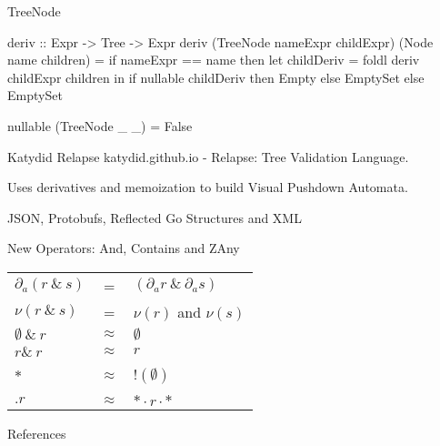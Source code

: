 \documentclass[10pt]{beamer}
\begin{document}
\begin{frame}[fragile]{TreeNode}
\begin{haskellcode}
deriv :: Expr -> Tree -> Expr
deriv (TreeNode nameExpr childExpr) 
      (Node name children) = 
  if nameExpr == name then
     let childDeriv = foldl deriv childExpr children
     in if nullable childDeriv
        then Empty
        else EmptySet
  else EmptySet
    
nullable (TreeNode _ _) = False
\end{haskellcode}
\end{frame}


\begin{frame}{Katydid Relapse}
katydid.github.io - Relapse: Tree Validation Language.

Uses derivatives and memoization to build Visual Pushdown Automata.

JSON, Protobufs, Reflected Go Structures and XML

New Operators: And, Contains and ZAny

\begin{center}
\begin{tabular}{l c l}
$\partial_a (r\ \&\ s) $ & = & $(\partial_a r\ \&\ \partial_a s)$ \\
$\nu(r\ \&\ s)$ & = & $\nu(r)$ and $\nu(s)$ \\
$\emptyset\ \&\ r$ & $\approx$ & $\emptyset$ \\
$r \&\ r$ & $\approx$ & $r$ \\
\\
$*$ & $\approx$ & $!(\emptyset)$ \\
\\
$.r$ & $\approx$ & $* \cdot r \cdot *$ \\
\end{tabular}
\end{center}
\end{frame}


\begin{frame}{References}

  
  

\end{frame}
\end{document}

